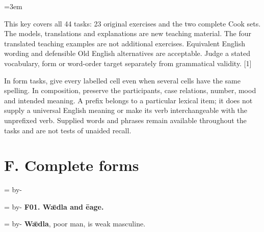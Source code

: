 \newcommand{\runningtitle}{Unit 14. Answer key}

\emergencystretch=3em
\newcommand{\itempara}[2]{\par\addvspace{3pt}\noindent\hangindent=1.8em\hangafter=1\makebox[1.8em][l]{#1.}#2\par}
\newcommand{\reserve}[1]{\par\penalty-100\begingroup\dimen0=\pagegoal\advance\dimen0 by-\pagetotal\ifdim\dimen0<#1\newpage\fi\endgroup}

\raggedright
{}

This key covers all 44 tasks: 23 original exercises and the two complete Cook sets. The models, translations and explanations are new teaching material. The four translated teaching examples are not additional exercises. Equivalent English wording and defensible Old English alternatives are acceptable. Judge a stated vocabulary, form or word-order target separately from grammatical validity. [1]

In form tasks, give every labelled cell even when several cells have the same spelling. In composition, preserve the participants, case relations, number, mood and intended meaning. A prefix belongs to a particular lexical item; it does not supply a universal English meaning or make its verb interchangeable with the unprefixed verb. Supplied words and phrases remain available throughout the tasks and are not tests of unaided recall.

\clearpage
\section*{F. Complete forms}

\reserve{5\baselineskip}
\reserve{8\baselineskip}
\textbf{F01. Wǣdla and ēage.}

\reserve{11\baselineskip}
\textbf{Wǣdla}, poor man, is weak masculine.

